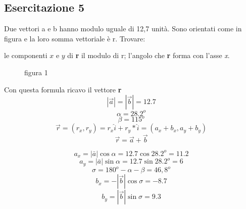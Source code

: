 \subsection{Esercitazione 5}
Due vettori a e b hanno modulo uguale di 12,7 unità. Sono orientati come in
figura e la loro somma vettoriale è r. Trovare:
\begin{tasks}
	\task le componenti $x$ e $y$ di \textbf{r}
	\task il modulo di r;
	\task l'angolo che \textbf{r} forma con l'asse \textit{x}.
\end{tasks}
\begin{figure}[!ht]
	\centering
	\caption{figura 1}
\end{figure}
\begin{multicols}{2}
	Con questa formula ricavo il vettore \textbf{r}
	\begin{equation*}
		|\overrightarrow{a}|=|\overrightarrow{b}|=12.7
	\end{equation*}
	\begin{equation*}
		\alpha=28.2^o
	\end{equation*}
	\begin{equation*}
		\beta=115^o
	\end{equation*}
	\begin{equation*}
		\overrightarrow{r}=(r_x,r_y)=r_x \hat{i}+r_y*\hat{i}=(a_x+b_x, a_y+b_y)
	\end{equation*}
	\begin{equation*}
		\overrightarrow{r}=\overrightarrow{a}+\overrightarrow{b}
	\end{equation*}
\end{multicols}
\begin{multicols}{2}
	\begin{equation*}
		a_x=|\bar{a}|\cos \alpha=12.7\cos 28.2^o=11.2
	\end{equation*}
	\begin{equation*}
		a_y=|\bar{a}|\sin \alpha=12.7\sin 28.2^o=6
	\end{equation*}
	\begin{equation*}
		\sigma=180^o-\alpha-\beta=46,8^o
	\end{equation*}
	\begin{equation*}
		b_x=-|\overrightarrow{b}|\cos \sigma=-8.7
	\end{equation*}
	\begin{equation*}
		b_y=|\overrightarrow{b}|\sin \sigma=9.3
	\end{equation*}
\end{multicols}
